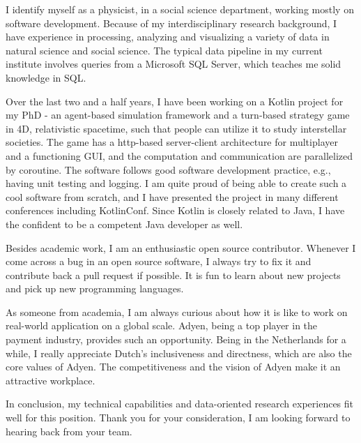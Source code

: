 \documentclass[11pt, a4paper]{awesome-cv}
\begin{document}
\makecvheader[R]

\makecvfooter
  {}%
  {}%
  {}

\makelettertitle

\begin{cvletter}

I identify myself as a physicist, in a social science department, working mostly on software development.
Because of my interdisciplinary research background,
I have experience in processing, analyzing and visualizing a variety of data in natural science and social science.
The typical data pipeline in my current institute involves queries from a Microsoft SQL Server,
which teaches me solid knowledge in SQL.

Over the last two and a half years,
I have been working on a Kotlin project for my PhD -
an agent-based simulation framework and a turn-based strategy game in 4D, relativistic spacetime,
such that people can utilize it to study interstellar societies.
The game has a http-based server-client architecture for multiplayer and a functioning GUI,
and the computation and communication are parallelized by coroutine.
The software follows good software development practice, e.g., having unit testing and logging.
I am quite proud of being able to create such a cool software from scratch,
and I have presented the project in many different conferences including KotlinConf.
Since Kotlin is closely related to Java,
I have the confident to be a competent Java developer as well.

Besides academic work, I am an enthusiastic open source contributor. 
Whenever I come across a bug in an open source software,
I always try to fix it and contribute back a pull request if possible.
It is fun to learn about new projects and pick up new programming languages.

As someone from academia,
I am always curious about how it is like to work on real-world application
on a global scale.
Adyen, being a top player in the payment industry,
provides such an opportunity.
Being in the Netherlands for a while,
I really appreciate Dutch's inclusiveness and directness,
which are also the core values of Adyen.
The competitiveness and the vision of Adyen make it an attractive workplace.

In conclusion, my technical capabilities and data-oriented research experiences
fit well for this position.
Thank you for your consideration, I am looking forward to hearing back from your team.


\end{cvletter}


\makeletterclosing
\end{document}
